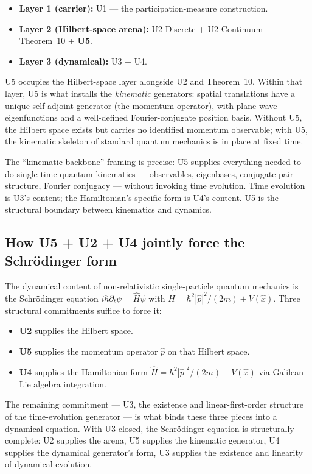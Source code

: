 \documentclass[11pt,a4paper]{article}
\begin{document}
\begin{itemize}
  \item \textbf{Layer 1 (carrier):} U1 --- the participation-measure construction.
  \item \textbf{Layer 2 (Hilbert-space arena):} U2-Discrete + U2-Continuum + Theorem~10 + \textbf{U5}.
  \item \textbf{Layer 3 (dynamical):} U3 + U4.
\end{itemize}

U5 occupies the Hilbert-space layer alongside U2 and Theorem~10. Within that layer, U5 is what installs the \emph{kinematic} generators: spatial translations have a unique self-adjoint generator (the momentum operator), with plane-wave eigenfunctions and a well-defined Fourier-conjugate position basis. Without U5, the Hilbert space exists but carries no identified momentum observable; with U5, the kinematic skeleton of standard quantum mechanics is in place at fixed time.

The ``kinematic backbone'' framing is precise: U5 supplies everything needed to do single-time quantum kinematics --- observables, eigenbases, conjugate-pair structure, Fourier conjugacy --- without invoking time evolution. Time evolution is U3's content; the Hamiltonian's specific form is U4's content. U5 is the structural boundary between kinematics and dynamics.

\subsection{How U5 + U2 + U4 jointly force the Schr\"odinger form}

The dynamical content of non-relativistic single-particle quantum mechanics is the Schr\"odinger equation $i\hbar \partial_t \psi = \hat{H} \psi$ with $\hat{H} = \hbar^2|\hat{p}|^2/(2m) + V(\hat{x})$. Three structural commitments suffice to force it:

\begin{itemize}
  \item \textbf{U2} supplies the Hilbert space.
  \item \textbf{U5} supplies the momentum operator $\hat{p}$ on that Hilbert space.
  \item \textbf{U4} supplies the Hamiltonian form $\hat{H} = \hbar^2|\hat{p}|^2/(2m) + V(\hat{x})$ via Galilean Lie algebra integration.
\end{itemize}

The remaining commitment --- U3, the existence and linear-first-order structure of the time-evolution generator --- is what binds these three pieces into a dynamical equation. With U3 closed, the Schr\"odinger equation is structurally complete: U2 supplies the arena, U5 supplies the kinematic generator, U4 supplies the dynamical generator's form, U3 supplies the existence and linearity of dynamical evolution.
\end{document}
